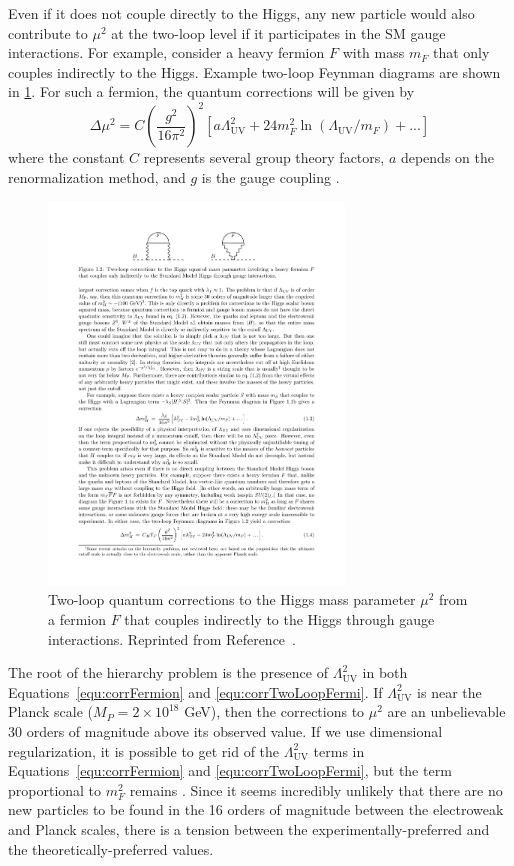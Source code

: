 Even if it does not couple directly to the Higgs, any new particle would also contribute to $\mu^2$ at the two-loop level if it participates in the SM gauge interactions. For example, consider a heavy fermion $F$ with mass $m_F$ that only couples indirectly to the Higgs. Example two-loop Feynman diagrams are shown in 
\ref{fig:hierarchyFermi}. For such a fermion, the quantum corrections will be given by
\begin{equation}
\Delta\mu^2 = C(\frac{g^2}{16\pi^2})^2 [a \Lambda^2_\mathrm{UV} + 24m_F^2 \ln(\Lambda_\mathrm{UV}/m_F) +...]
\label{equ:corrTwoLoopFermi}
\end{equation}
where the constant $C$ represents several group theory factors, $a$ depends on the renormalization method, and $g$ is the gauge coupling \cite{SUSYprimer}. 

\begin{figure}[htbp]
    \centering
    \includegraphics[width=0.7\textwidth]{Figures/Theory/hierarchyLoopFermi.pdf}
    \caption[Two-loop quantum corrections to the Higgs mass parameter.]{Two-loop quantum corrections to the Higgs mass parameter $\mu^2$ from a fermion $F$ that couples indirectly to the Higgs through gauge interactions.
    Reprinted from Reference~\cite{SUSYprimer}.}
    \label{fig:hierarchyFermi}
\end{figure}

The root of the hierarchy problem is the presence of $\Lambda^2_\mathrm{UV}$ in both Equations~\ref{equ:corrFermion} and \ref{equ:corrTwoLoopFermi}. If $\Lambda^2_\mathrm{UV}$ is near the Planck scale ($M_P = 2 \times 10^{18}$ GeV), then the corrections to $\mu^2$ are an unbelievable 30 orders of magnitude above its observed value. If we use dimensional regularization, it is possible to get rid of the $\Lambda^2_\mathrm{UV}$ terms in Equations~\ref{equ:corrFermion} and \ref{equ:corrTwoLoopFermi}, but the term proportional to $m_F^2$ remains \cite{SUSYprimer}. Since it seems incredibly unlikely that there are no new particles to be found in the 16 orders of magnitude between the electroweak and Planck scales, there is a tension between the experimentally-preferred and the theoretically-preferred values.

